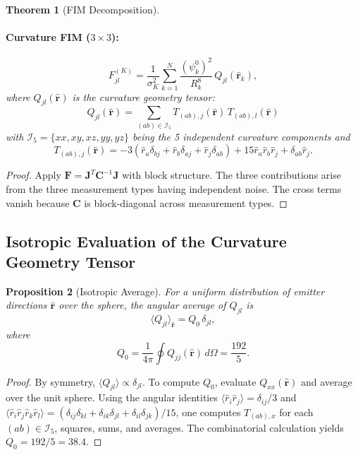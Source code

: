 \documentclass[twocolumn,superscriptaddress,prd,nofootinbib]{revtex4-2}
\newcommand{\FIM}{\mathbf{F}}
\newcommand{\rvec}{\mathbf{r}}
\newtheorem{theorem}{Theorem}
\newtheorem{proposition}[theorem]{Proposition}
\begin{document}
\begin{theorem}[FIM Decomposition]
\paragraph{Curvature FIM ($3\times 3$):}
\begin{equation}
F_{jl}^{(K)} = \frac{1}{\sigma_K^2}\sum_{k=1}^N
\frac{(\psi_k^0)^2}{R_k^8}\,Q_{jl}(\hat{\rvec}_k),
\label{eq:Fcurv}
\end{equation}
where $Q_{jl}(\hat{\rvec})$ is the curvature geometry tensor:
\begin{equation}
Q_{jl}(\hat{\rvec}) = \sum_{(ab)\in\mathcal{I}_5}
T_{(ab),j}(\hat{\rvec})\,T_{(ab),l}(\hat{\rvec})
\label{eq:Qjl}
\end{equation}
with $\mathcal{I}_5 = \{xx,xy,xz,yy,yz\}$ being the 5 independent
curvature components and
\begin{equation}
T_{(ab),j}(\hat{\rvec}) = -3(\hat{r}_a\delta_{bj}+\hat{r}_b\delta_{aj}
+\hat{r}_j\delta_{ab}) + 15\hat{r}_a\hat{r}_b\hat{r}_j
+ \delta_{ab}\hat{r}_j.
\end{equation}
\end{theorem}

\begin{proof}
Apply $\FIM = \mathbf{J}^T\mathbf{C}^{-1}\mathbf{J}$ with block
structure. The three contributions arise from the three measurement
types having independent noise. The cross terms vanish because
$\mathbf{C}$ is block-diagonal across measurement types.
\end{proof}

\subsection{Isotropic Evaluation of the Curvature Geometry Tensor}

\begin{proposition}[Isotropic Average]\label{prop:isotropic}
For a uniform distribution of emitter directions $\hat{\rvec}$ over the
sphere, the angular average of $Q_{jl}$ is
\begin{equation}
\langle Q_{jl}\rangle_{\hat{\rvec}} = Q_0\,\delta_{jl},
\label{eq:Q-iso}
\end{equation}
where
\begin{equation}
Q_0 = \frac{1}{4\pi}\oint Q_{jj}(\hat{\rvec})\,d\Omega
= \frac{192}{5}.
\label{eq:Q0}
\end{equation}
\end{proposition}

\begin{proof}
By symmetry, $\langle Q_{jl}\rangle \propto \delta_{jl}$. To compute
$Q_0$, evaluate $Q_{xx}(\hat{\rvec})$ and average over the unit sphere.
Using the angular identities $\langle\hat{r}_i\hat{r}_j\rangle = \delta_{ij}/3$
and $\langle\hat{r}_i\hat{r}_j\hat{r}_k\hat{r}_l\rangle
= (\delta_{ij}\delta_{kl}+\delta_{ik}\delta_{jl}+\delta_{il}\delta_{jk})/15$,
one computes $T_{(ab),x}$ for each $(ab) \in \mathcal{I}_5$, squares,
sums, and averages. The combinatorial calculation yields
$Q_0 = 192/5 = 38.4$.
\end{proof}
\end{document}
